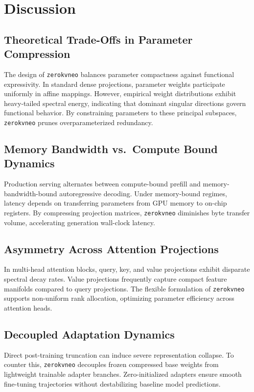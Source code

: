 \section{Discussion}

\subsection{Theoretical Trade-Offs in Parameter Compression}
The design of \texttt{zerokvneo} balances parameter compactness against functional expressivity. In standard dense projections, parameter weights participate uniformly in affine mappings. However, empirical weight distributions exhibit heavy-tailed spectral energy, indicating that dominant singular directions govern functional behavior. By constraining parameters to these principal subspaces, \texttt{zerokvneo} prunes overparameterized redundancy.

\subsection{Memory Bandwidth vs.\ Compute Bound Dynamics}
Production serving alternates between compute-bound prefill and memory-bandwidth-bound autoregressive decoding. Under memory-bound regimes, latency depends on transferring parameters from GPU memory to on-chip registers. By compressing projection matrices, \texttt{zerokvneo} diminishes byte transfer volume, accelerating generation wall-clock latency.

\subsection{Asymmetry Across Attention Projections}
In multi-head attention blocks, query, key, and value projections exhibit disparate spectral decay rates. Value projections frequently capture compact feature manifolds compared to query projections. The flexible formulation of \texttt{zerokvneo} supports non-uniform rank allocation, optimizing parameter efficiency across attention heads.

\subsection{Decoupled Adaptation Dynamics}
Direct post-training truncation can induce severe representation collapse. To counter this, \texttt{zerokvneo} decouples frozen compressed base weights from lightweight trainable adapter branches. Zero-initialized adapters ensure smooth fine-tuning trajectories without destabilizing baseline model predictions.

